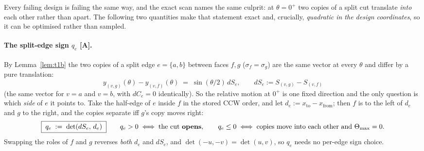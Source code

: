 \documentclass[11pt,a4paper]{article}
\theoremstyle{definition}
\newcommand{\Tmax}{\Theta_{\max}}
\begin{document}
Every failing design is failing the same way, and the exact scan names the same culprit: at
$\theta=0^+$ two copies of a split cut translate \emph{into} each other rather than apart.
The following two quantities make that statement exact and, crucially, \emph{quadratic in the
design coordinates}, so it can be optimised rather than sampled.

\paragraph{The split-edge sign $q_e$ [A].} By Lemma~\ref{lem:t1b} the two copies of a split
edge $e=\{a,b\}$ between faces $f,g$ ($\sigma_f=\sigma_g$) are the same vector at every
$\theta$ and differ by a pure translation:
\[
y_{(v,g)}(\theta)-y_{(v,f)}(\theta) \;=\; \sin(\theta/2)\,dS_e,
\qquad dS_e := S_{(v,g)}-S_{(v,f)}
\]
(the same vector for $v=a$ and $v=b$, with $dC_e=0$ identically). So the relative motion at
$0^+$ is one fixed direction and the only question is which \emph{side} of $e$ it points to.
Take the half-edge of $e$ inside $f$ in the stored CCW order, and let
$d_e := x_{\mathrm{to}}-x_{\mathrm{from}}$; then $f$ is to the left of $d_e$ and $g$ to the
right, and the copies separate iff $g$'s copy moves right:
\begin{equation}
\boxed{\;q_e \;:=\; \det(dS_e,\,d_e)\;}
\qquad
q_e>0 \iff \text{the cut \textbf{opens}},
\qquad
q_e\le0 \iff \text{copies move into each other and }\Tmax=0 .
\label{eq:qe}
\end{equation}
Swapping the roles of $f$ and $g$ reverses \emph{both} $d_e$ and $dS_e$, and
$\det(-u,-v)=\det(u,v)$, so $q_e$ needs no per-edge sign choice.
\end{document}
